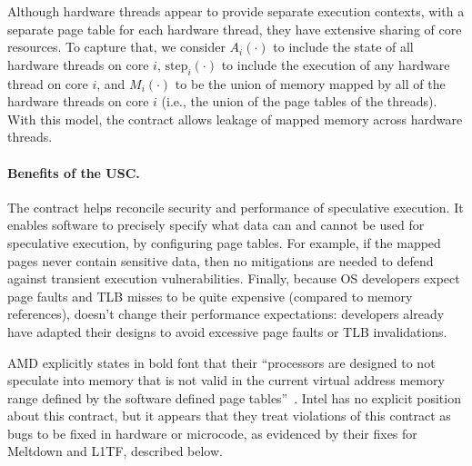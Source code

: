 Although hardware threads appear to provide separate execution
contexts, with a separate page table for each hardware thread, they
have extensive sharing of core resources.  To capture that, we consider
$A_i(\cdot)$ to include the state of all hardware threads on core $i$,
$\textrm{step}_i(\cdot)$ to include the execution of any hardware thread
on core $i$, and $M_i(\cdot)$ to be the union of memory mapped by all
of the hardware threads on core $i$ (i.e., the union of the page tables
of the threads).  With this model, the contract allows leakage of mapped
memory across hardware threads.


\paragraph{Benefits of the USC.}

The contract helps reconcile security and performance of speculative
execution.  It enables software to precisely specify what data can and cannot
be used for speculative execution, by configuring page
tables.  For example, if the mapped pages never contain sensitive data,
then no mitigations are needed to defend against transient execution
vulnerabilities.  Finally,
because OS developers expect page faults and TLB misses to be quite
expensive (compared to memory references), \contract doesn't change
their performance expectations: developers already have adapted their
designs to avoid excessive page faults or TLB invalidations.


AMD explicitly states in bold font that
their ``processors are designed to not speculate into memory that is
not valid in the current virtual address memory range defined by the
software defined page tables''~\cite[pg. 2]{amd:speculation}.  Intel
has no explicit position about this contract, but it appears
that they treat violations of this contract as bugs to be fixed in
hardware or microcode, as evidenced by their fixes for Meltdown and
L1TF, described below.


